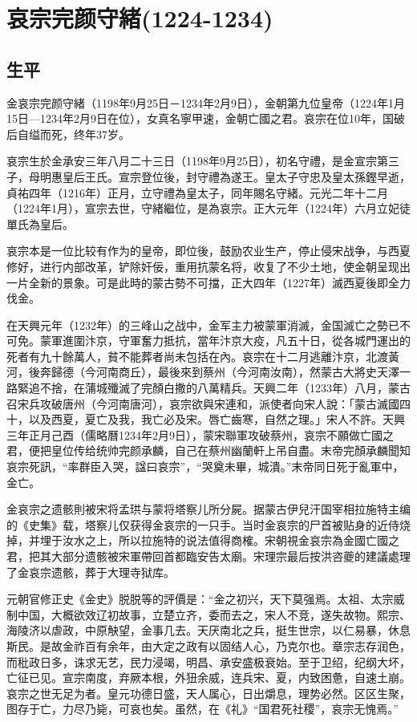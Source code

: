 
\section{哀宗完颜守緒\tiny(1224-1234)}

\subsection{生平}

金哀宗完颜守緒（1198年9月25日－1234年2月9日），金朝第九位皇帝（1224年1月15日—1234年2月9日在位），女真名寧甲速，金朝亡國之君。哀宗在位10年，国破后自缢而死，终年37岁。

哀宗生於金承安三年八月二十三日（1198年9月25日），初名守禮，是金宣宗第三子，母明惠皇后王氏。宣宗登位後，封守禮為遂王。皇太子守忠及皇太孫鏗早逝，貞祐四年（1216年）正月，立守禮為皇太子，同年賜名守緒。元光二年十二月（1224年1月），宣宗去世，守緒繼位，是為哀宗。正大元年（1224年）六月立妃徒單氏為皇后。

哀宗本是一位比较有作为的皇帝，即位後，鼓励农业生产，停止侵宋战争，与西夏修好，进行内部改革，铲除奸佞，重用抗蒙名将，收复了不少土地，使金朝呈现出一片全新的景象。可是此時的蒙古勢不可擋，正大四年（1227年）滅西夏後即全力伐金。

在天興元年（1232年）的三峰山之战中，金军主力被蒙軍消滅，金国滅亡之勢已不可免。蒙軍進圍汴京，守軍奮力抵抗，當年汴京大疫，凡五十日，從各城門運出的死者有九十餘萬人，貧不能葬者尚未包括在內。哀宗在十二月逃離汴京，北渡黃河，後奔歸德（今河南商丘），最後來到蔡州（今河南汝南），然蒙古大將史天澤一路緊追不捨，在蒲城殲滅了完顏白撒的八萬精兵。天興二年（1233年）八月，蒙古召宋兵攻破唐州（今河南唐河），哀宗欲與宋連和，派使者向宋人說：「蒙古滅國四十，以及西夏，夏亡及我，我亡必及宋。唇亡齒寒，自然之理。」宋人不許。天興三年正月己酉（儒略曆1234年2月9日），蒙宋聯軍攻破蔡州，哀宗不願做亡國之君，便把皇位传给统帅完颜承麟，自己在蔡州幽蘭軒上吊自盡。末帝完顏承麟聞知哀宗死訊，“率群臣入哭，諡曰哀宗”，“哭奠未畢，城潰。”末帝同日死于亂軍中，金亡。

金哀宗之遗骸則被宋将孟珙与蒙将塔察儿所分屍。据蒙古伊兒汗国宰相拉施特主编的《史集》载，塔察儿仅获得金哀宗的一只手。当时金哀宗的尸首被贴身的近侍烧掉，并埋于汝水之上，所以拉施特的说法值得商榷。宋朝視金哀宗為金國亡國之君，把其大部分遗骸被宋軍帶回首都臨安告太廟。宋理宗最后按洪咨夔的建議處理了金哀宗遗骸，葬于大理寺狱库。

元朝官修正史《金史》脱脱等的評價是：“金之初兴，天下莫强焉。太祖、太宗威制中国，大概欲效辽初故事，立楚立齐，委而去之，宋人不竞，遂失故物。熙宗、海陵济以虐政，中原觖望，金事几去。天厌南北之兵，挺生世宗，以仁易暴，休息斯民。是故金祚百有余年，由大定之政有以固结人心，乃克尔也。章宗志存润色，而秕政日多，诛求无艺，民力浸竭，明昌、承安盛极衰始。至于卫绍，纪纲大坏，亡征已见。宣宗南度，弃厥本根，外狃余威，连兵宋、夏，内致困惫，自速土崩。哀宗之世无足为者。皇元功德日盛，天人属心，日出爝息，理势必然。区区生聚，图存于亡，力尽乃毙，可哀也矣。虽然，在《礼》“国君死社稷”，哀宗无愧焉。”

